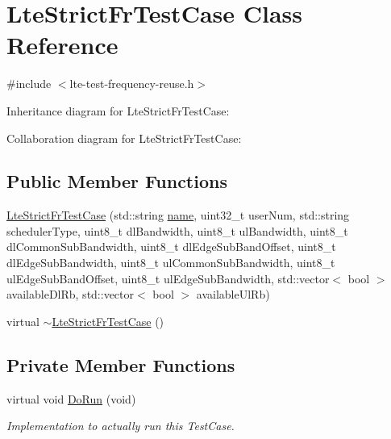 \hypertarget{classLteStrictFrTestCase}{}\section{Lte\+Strict\+Fr\+Test\+Case Class Reference}
\label{classLteStrictFrTestCase}


{\ttfamily \#include $<$lte-\/test-\/frequency-\/reuse.\+h$>$}



Inheritance diagram for Lte\+Strict\+Fr\+Test\+Case\+:


Collaboration diagram for Lte\+Strict\+Fr\+Test\+Case\+:
\subsection*{Public Member Functions}
\begin{DoxyCompactItemize}
\item 
\hyperlink{classLteStrictFrTestCase_ac4fec8d0d83e49aa2745985458d86576}{Lte\+Strict\+Fr\+Test\+Case} (std\+::string \hyperlink{generate__test__data__lte__spectrum__model_8m_ab74e6bf80237ddc4109968cedc58c151}{name}, uint32\+\_\+t user\+Num, std\+::string scheduler\+Type, uint8\+\_\+t dl\+Bandwidth, uint8\+\_\+t ul\+Bandwidth, uint8\+\_\+t dl\+Common\+Sub\+Bandwidth, uint8\+\_\+t dl\+Edge\+Sub\+Band\+Offset, uint8\+\_\+t dl\+Edge\+Sub\+Bandwidth, uint8\+\_\+t ul\+Common\+Sub\+Bandwidth, uint8\+\_\+t ul\+Edge\+Sub\+Band\+Offset, uint8\+\_\+t ul\+Edge\+Sub\+Bandwidth, std\+::vector$<$ bool $>$ available\+Dl\+Rb, std\+::vector$<$ bool $>$ available\+Ul\+Rb)
\item 
virtual \hyperlink{classLteStrictFrTestCase_a0192cce76f90c4de7a5a87eeb5d5da14}{$\sim$\+Lte\+Strict\+Fr\+Test\+Case} ()
\end{DoxyCompactItemize}
\subsection*{Private Member Functions}
\begin{DoxyCompactItemize}
\item 
virtual void \hyperlink{classLteStrictFrTestCase_afd223c9e5a1d3e14a244303963e21425}{Do\+Run} (void)
\begin{DoxyCompactList}\small\item\em Implementation to actually run this Test\+Case. \end{DoxyCompactList}\end{DoxyCompactItemize}
